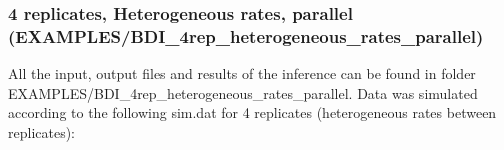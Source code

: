 \documentclass[]{article}   %
\begin{document}
\subsubsection{4 replicates, Heterogeneous rates, parallel (EXAMPLES/BDI\_4rep\_heterogeneous\_rates\_parallel)}
All the input, output files and results of the inference can be found in folder EXAMPLES/BDI\_4rep\_heterogeneous\_rates\_parallel. 
Data was simulated according to the following sim.dat for 4 replicates (heterogeneous rates between replicates):





\end{document}

